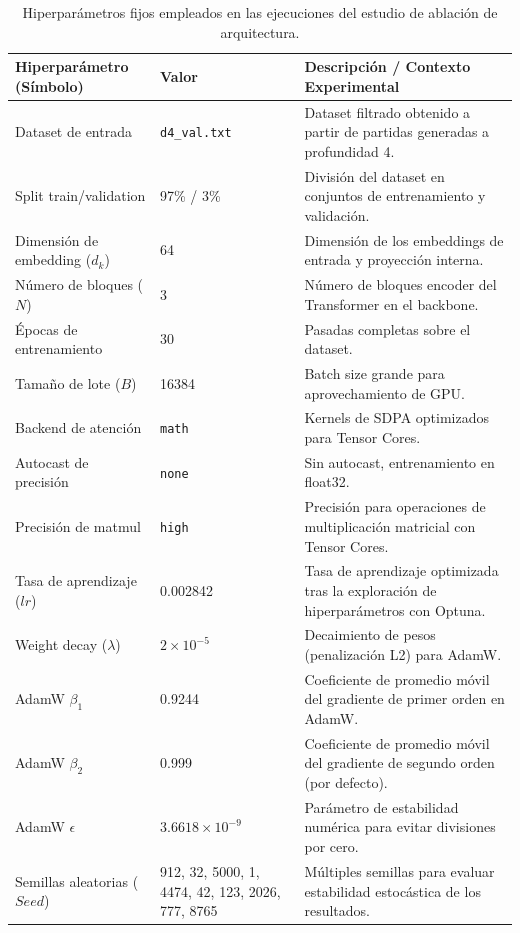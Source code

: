 \documentclass[12pt, a4paper]{article}
\begin{document}
\begin{table}[htbp]
    \centering
    \begin{tabular}{|p{4.5cm}|p{3cm}|p{8.5cm}|}
    \hline
    \textbf{Hiperparámetro (Símbolo)} & \textbf{Valor} & \textbf{Descripción / Contexto Experimental} \\
    \hline
    Dataset de entrada & \texttt{d4\_val.txt} & Dataset filtrado obtenido a partir de partidas generadas a profundidad 4. \\ \hline
    Split train/validation & 97\% / 3\% & División del dataset en conjuntos de entrenamiento y validación. \\ \hline
    Dimensión de embedding ($d_k$) & 64 & Dimensión de los embeddings de entrada y proyección interna. \\ \hline
    Número de bloques ($N$) & 3 & Número de bloques encoder del Transformer en el backbone. \\ \hline
    Épocas de entrenamiento & 30 & Pasadas completas sobre el dataset. \\ \hline
    Tamaño de lote ($B$) & 16384 & Batch size grande para aprovechamiento de GPU. \\ \hline
    Backend de atención & \texttt{math} & Kernels de SDPA optimizados para Tensor Cores. \\ \hline
    Autocast de precisión & \texttt{none} & Sin autocast, entrenamiento en float32. \\ \hline
    Precisión de matmul & \texttt{high} & Precisión para operaciones de multiplicación matricial con Tensor Cores. \\ \hline
    Tasa de aprendizaje ($lr$) & 0.002842 & Tasa de aprendizaje optimizada tras la exploración de hiperparámetros con Optuna. \\ \hline
    Weight decay ($\lambda$) & $2\times 10^{-5}$ & Decaimiento de pesos (penalización L2) para AdamW. \\ \hline
    AdamW $\beta_1$ & 0.9244 & Coeficiente de promedio móvil del gradiente de primer orden en AdamW. \\ \hline
    AdamW $\beta_2$ & 0.999 & Coeficiente de promedio móvil del gradiente de segundo orden (por defecto). \\ \hline
    AdamW $\epsilon$ & $3.6618\times 10^{-9}$ & Parámetro de estabilidad numérica para evitar divisiones por cero. \\ \hline
    Semillas aleatorias ($Seed$) & 912, 32, 5000, 1, 4474, 42, 123, 2026, 777, 8765 & Múltiples semillas para evaluar estabilidad estocástica de los resultados. \\
    \hline
\end{tabular}
    \caption[Hiperparámetros fijos del estudio de ablación]{Hiperparámetros fijos empleados en las ejecuciones del estudio de ablación de arquitectura.}
    \label{tab:hiperparametros_ablation}
\end{table}
\end{document}
